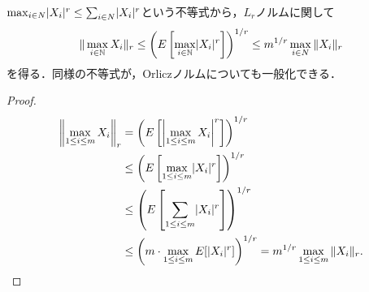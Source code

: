\documentclass[uplatex,dvipdfmx]{jsreport}
\begin{document}
\begin{tcolorbox}[colframe=ForestGreen, colback=ForestGreen!10!white,breakable,colbacktitle=ForestGreen!40!white,coltitle=black,fonttitle=\bfseries\sffamily,
title=]
    $\max_{i\in N}\lvert X_i\rvert^r\le\sum_{i\in N}\lvert X_i\rvert^r$という不等式から，$L_r$ノルムに関して
    \[\|\max_{i\in\mathbb{N}}X_i\|_r\le\left(E\left[\max_{i\in\mathbb{N}}\lvert X_i\rvert^r\right]\right)^{1/r}\le m^{1/r}\max_{i\in N}\|X_i\|_r\]
    を得る．同様の不等式が，Orliczノルムについても一般化できる．
\end{tcolorbox}
\begin{proof}
    \begin{align*}
        \left\|\max_{1\le i\le m}X_i\right\|_r&=\left(E\left[\left|\max_{1\le i\le m}X_i\right|^r\right]\right)^{1/r}\\
        &\le\left(E\left[\max_{1\le i\le m}\lvert X_i\rvert^r\right]\right)^{1/r}\\
        &\le\left(E\left[\sum_{1\le i\le m}\lvert X_i\rvert^r\right]\right)^{1/r}\\
        &\le\left(m\cdot\max_{1\le i\le m}E[\lvert X_i\rvert^r]\right)^{1/r}=m^{1/r}\max_{1\le i\le m}\|X_i\|_r.
    \end{align*}
\end{proof}
\end{document}
